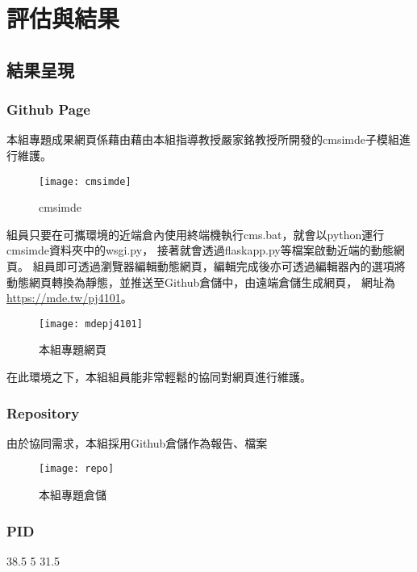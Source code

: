 \chapter{評估與結果}

\section{結果呈現}
\subsection{Github Page}
本組專題成果網頁係藉由藉由本組指導教授嚴家銘教授所開發的cmsimde子模組進行維護。\\

\begin{figure}[h]
    \centering
    \texttt{[image: cmsimde]}
    \caption{cmsimde}
\end{figure}

組員只要在可攜環境的近端倉內使用終端機執行cms.bat，就會以python運行cmsimde資料夾中的wsgi.py，
接著就會透過flaskapp.py等檔案啟動近端的動態網頁。
組員即可透過瀏覽器編輯動態網頁，編輯完成後亦可透過編輯器內的選項將動態網頁轉換為靜態，並推送至Github倉儲中，由遠端倉儲生成網頁，
網址為\url{https://mde.tw/pj4101}。\\

\begin{figure}[h]
    \centering
    \texttt{[image: mdepj4101]}
    \caption{本組專題網頁}
\end{figure}

在此環境之下，本組組員能非常輕鬆的協同對網頁進行維護。\\

\subsection{Repository}
由於協同需求，本組採用Github倉儲作為報告、檔案
\begin{figure}[h]
    \centering
    \texttt{[image: repo]}
    \caption{本組專題倉儲}
\end{figure}

\subsection{PID}
38.5
5
31.5

\subsection{}

